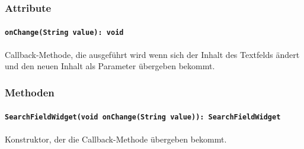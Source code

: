 \documentclass{entwurfsheft}
\begin{document}
\begin{sloppypar}
\subsubsection*{Attribute}
\paragraph{\texttt{onChange(String value): void}}
Callback-Methode, die ausgeführt wird wenn sich der Inhalt des Textfelds ändert und den neuen Inhalt als Parameter übergeben bekommt.
\subsubsection*{Methoden}
\paragraph{\texttt{SearchFieldWidget(void onChange(String value)): SearchFieldWidget}}
Konstruktor, der die Callback-Methode übergeben bekommt.
\newpage

\end{sloppypar}
\end{document}
